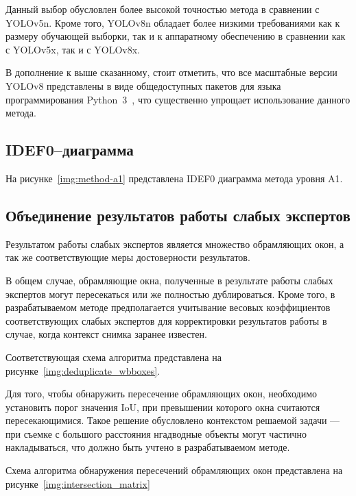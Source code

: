 Данный выбор обусловлен более высокой точностью метода в сравнении с YOLOv5n. Кроме того, YOLOv8n обладает более низкими требованиями как к размеру обучающей выборки, так и к аппаратному обеспечению в сравнении как с YOLOv5x, так и с YOLOv8x.

В дополнение к выше сказанному, стоит отметить, что все масштабные версии YOLOv8 представлены в виде общедоступных пакетов для языка программирования Python~3~\cite{python3}, что существенно упрощает использование данного метода.

\subsection{IDEF0–диаграмма}

На рисунке~\ref{img:method-a1} представлена IDEF0 диаграмма метода уровня A1.


\subsection{Объединение результатов работы слабых экспертов}

Результатом работы слабых экспертов является множество обрамляющих окон, а так же соответствующие меры достоверности результатов.

В общем случае, обрамляющие окна, полученные в результате работы слабых экспертов могут пересекаться или же полностью дублироваться. Кроме того, в разрабатываемом методе предполагается учитывание весовых коэффициентов соответствующих слабых экспертов для корректировки результатов работы в случае, когда контекст снимка заранее известен.

\clearpage

Соответствующая схема алгоритма представлена на рисунке~\ref{img:deduplicate_wbboxes}.


Для того, чтобы обнаружить пересечение обрамляющих окон, необходимо установить порог значения IoU, при превышении которого окна считаются пересекающимися. Такое решение обусловлено контекстом решаемой задачи --- при съемке с большого расстояния нгадводные объекты могут частично накладываться, что должно быть учтено в разрабатываемом методе.

Схема алгоритма обнаружения пересечений обрамляющих окон представлена на рисунке~\ref{img:intersection_matrix}


